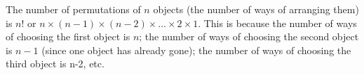 The number of permutations of $n$ objects (the number of ways of
  arranging them) is $n!$ or $n \times (n-1) \times (n-2) \times \dots
  \times 2 \times 1$.
  This is because the number of ways of choosing the first object is
  $n$; the number of ways of choosing the second object is $n-1$
  (since one object has already gone);
  the number of ways of choosing the third object is n-2, etc.